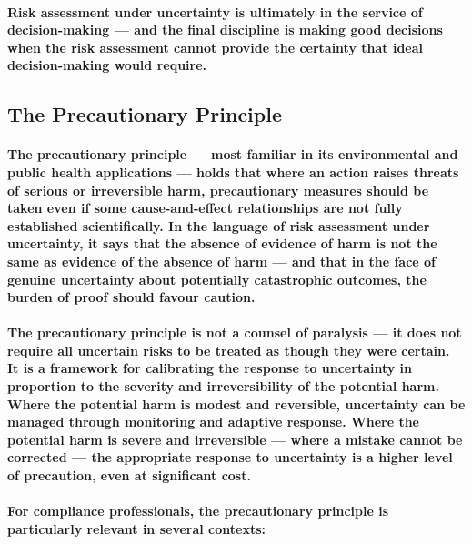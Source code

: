 \paragraph{Risk assessment under uncertainty is ultimately in the service of decision-making — and the final discipline is making good decisions when the risk assessment cannot provide the certainty that ideal decision-making would require.}

\subsection{The Precautionary Principle}
\paragraph{\textbf{The precautionary principle} — most familiar in its environmental and public health applications — holds that where an action raises threats of serious or irreversible harm, precautionary measures should be taken even if some cause-and-effect relationships are not fully established scientifically. In the language of risk assessment under uncertainty, it says that the absence of evidence of harm is not the same as evidence of the absence of harm — and that in the face of genuine uncertainty about potentially catastrophic outcomes, the burden of proof should favour caution.}
\paragraph{The precautionary principle is not a counsel of paralysis — it does not require all uncertain risks to be treated as though they were certain. It is a framework for calibrating the response to uncertainty in proportion to the severity and irreversibility of the potential harm. Where the potential harm is modest and reversible, uncertainty can be managed through monitoring and adaptive response. Where the potential harm is severe and irreversible — where a mistake cannot be corrected — the appropriate response to uncertainty is a higher level of precaution, even at significant cost.}
\paragraph{For compliance professionals, the precautionary principle is particularly relevant in several contexts:}
\begin{itemize}
\end{itemize}

